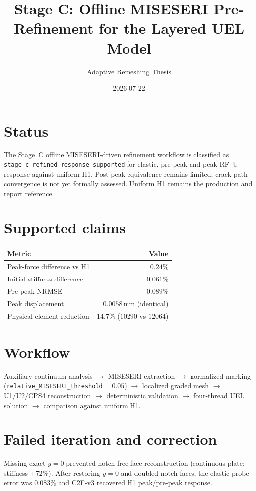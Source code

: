 \documentclass[11pt,a4paper]{article}
\title{Stage C: Offline MISESERI Pre-Refinement for the Layered UEL Model}
\author{Adaptive Remeshing Thesis}
\date{2026-07-22}
\begin{document}
\maketitle

\section{Status}
The Stage~C offline MISESERI-driven refinement workflow is classified as
\texttt{stage\_c\_refined\_response\_supported} for elastic, pre-peak and peak RF--U
response against uniform H1. Post-peak equivalence remains limited; crack-path
convergence is not yet formally assessed. Uniform H1 remains the production
and report reference.

\section{Supported claims}
\begin{table}[h]
\centering
\begin{tabular}{@{}lr@{}}
\toprule
Metric & Value \\
\midrule
Peak-force difference vs H1 & $0.24\%$ \\
Initial-stiffness difference & $0.061\%$ \\
Pre-peak NRMSE & $0.089\%$ \\
Peak displacement & $0.0058\,\mathrm{mm}$ (identical) \\
Physical-element reduction & $14.7\%$ ($10290$ vs $12064$) \\
\bottomrule
\end{tabular}
\end{table}

\section{Workflow}
Auxiliary continuum analysis $\to$ MISESERI extraction $\to$
normalized marking (\texttt{relative\_MISESERI\_threshold}$=0.05$) $\to$
localized graded mesh $\to$ U1/U2/CPS4 reconstruction $\to$
deterministic validation $\to$ four-thread UEL solution $\to$
comparison against uniform H1.

\section{Failed iteration and correction}
Missing exact $y=0$ prevented notch free-face reconstruction (continuous plate;
stiffness $+72\%$). After restoring $y=0$ and doubled notch faces, the elastic
probe error was $0.083\%$ and C2F-v3 recovered H1 peak/pre-peak response.
\end{document}
